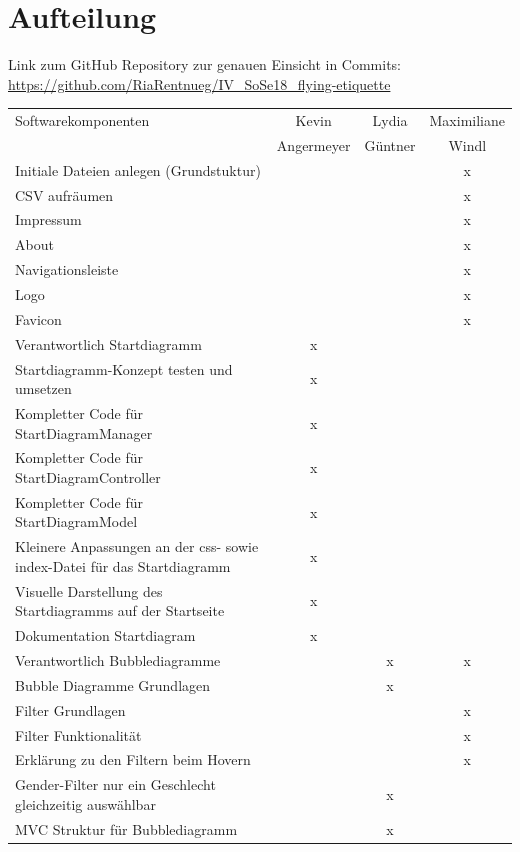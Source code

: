 \documentclass{mi-seminar}
\begin{document}
\section{Aufteilung}
Link zum GitHub Repository zur genauen Einsicht in Commits: \newline
\href{https://github.com/RiaRentnueg/IV_SoSe18_flying-etiquette}{https://github.com/RiaRentnueg/IV\_SoSe18\_flying-etiquette}
\linebreak \newline
{}
\begin{longtable}{p{5cm} | c | c | c}
Softwarekomponenten & Kevin & Lydia & Maximiliane \\
 & Angermeyer & Güntner & Windl \\
\hline
\endhead
Initiale Dateien anlegen (Grundstuktur)& & & x \\
CSV aufräumen & & & x \\
Impressum & & & x\\
About & & & x\\
Navigationsleiste & & & x\\
Logo & & & x \\
Favicon & & & x \\
Verantwortlich Startdiagramm & x & & \\
Startdiagramm-Konzept testen und umsetzen & x & & \\
Kompletter Code für StartDiagramManager & x & & \\
Kompletter Code für StartDiagramController & x & & \\
Kompletter Code für StartDiagramModel & x & & \\
Kleinere Anpassungen an der css- sowie index-Datei für das Startdiagramm & x & & \\
Visuelle Darstellung des Startdiagramms auf der Startseite & x & & \\
Dokumentation Startdiagram & x & & \\
Verantwortlich Bubblediagramme & & x & x \\
Bubble Diagramme Grundlagen & & x & \\
Filter Grundlagen & & & x \\
Filter Funktionalität & & & x \\
Erklärung zu den Filtern beim Hovern & & & x \\
Gender-Filter nur ein Geschlecht gleichzeitig auswählbar & & x & \\
MVC Struktur für Bubblediagramm & & x & \\

\end{longtable}
\end{document}
